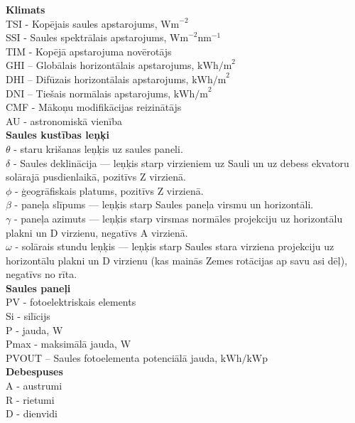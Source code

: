 \noindent 
\textbf{Klimats}\\
TSI - Kopējais saules apstarojums, $\textrm{Wm}^{-2}$\\
SSI - Saules spektrālais apstarojums, $\textrm{Wm}^{-2}\textrm{nm}^{-1}$\\
TIM - Kopējā apstarojuma novērotājs\\
GHI – Globālais horizontālais apstarojums,  $\textrm{kWh/m}^2$\\ %
DHI – Difūzais horizontālais apstarojums,  $\textrm{kWh/m}^2$\\ 
DNI – Tiešais normālais apstarojums, $\textrm{kWh/m}^2$\\ %
CMF - Mākoņu modifikācijas reizinātājs\\
AU - astronomiskā vienība\\  %
\textbf{Saules kustības leņķi}\\
$\theta$ - staru krišanas leņķis uz saules paneli.\\
$\delta$ - Saules deklinācija --- leņķis starp virzieniem uz Sauli un uz debess ekvatoru solārajā pusdienlaikā, pozitīvs Z virzienā.\\
 $\phi$  - ģeogrāfiskais platums, pozitīvs Z virzienā.\\
$\beta$  - paneļa slīpums --- leņķis starp Saules paneļa virsmu un horizontāli.\\
$\gamma$ - paneļa azimuts --- leņķis starp virsmas normāles projekciju uz horizontālu  plakni un D virzienu, negatīvs A virzienā.\\
$\omega$ - solārais stundu leņķis --- leņķis starp Saules stara virziena projekciju uz horizontālu plakni un D virzienu (kas mainās Zemes rotācijas ap  savu asi dēļ), negatīvs no rīta.\\
\textbf{Saules paneļi}\\
PV - fotoelektriskais elements\\ %
Si - silīcijs\\
P - jauda, 	W\\
Pmax - maksimālā jauda, W\\
PVOUT – Saules fotoelementa potenciālā jauda, $\textrm{kWh/kWp}$\\ %
\textbf{Debespuses}\\
A - austrumi\\
R - rietumi\\
D - dienvidi\\